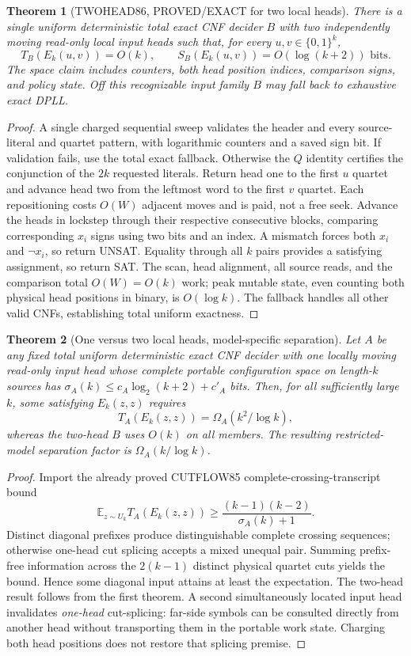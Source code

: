 \documentclass[11pt]{article}
\newtheorem{theorem}{Theorem}
\begin{document}
\begin{theorem}[TWOHEAD86, PROVED/EXACT for two local heads]
There is a single uniform deterministic total exact CNF decider $B$ with two independently moving read-only local input heads such that, for every $u,v\in\{0,1\}^k$,
\[
\boxed{T_B(E_k(u,v))=O(k),\qquad S_B(E_k(u,v))=O(\log(k+2))\text{ bits}.}
\]
The space claim includes counters, both head position indices, comparison signs, and policy state. Off this recognizable input family $B$ may fall back to exhaustive exact DPLL.
\end{theorem}
\begin{proof}
A single charged sequential sweep validates the header and every source-literal and quartet pattern, with logarithmic counters and a saved sign bit. If validation fails, use the total exact fallback. Otherwise the $Q$ identity certifies the conjunction of the $2k$ requested literals. Return head one to the first $u$ quartet and advance head two from the leftmost word to the first $v$ quartet. Each repositioning costs $O(W)$ adjacent moves and is paid, not a free seek. Advance the heads in lockstep through their respective consecutive blocks, comparing corresponding $x_i$ signs using two bits and an index. A mismatch forces both $x_i$ and $\neg x_i$, so return UNSAT. Equality through all $k$ pairs provides a satisfying assignment, so return SAT. The scan, head alignment, all source reads, and the comparison total $O(W)=O(k)$ work; peak mutable state, even counting both physical head positions in binary, is $O(\log k)$. The fallback handles all other valid CNFs, establishing total uniform exactness.
\end{proof}

\begin{theorem}[One versus two local heads, model-specific separation]
Let $A$ be any fixed total uniform deterministic exact CNF decider with one locally moving read-only input head whose \emph{complete portable configuration space} on length-$k$ sources has $\sigma_A(k)\le c_A\log_2(k+2)+c'_A$ bits. Then, for all sufficiently large $k$, some satisfying $E_k(z,z)$ requires
\[
\boxed{T_A(E_k(z,z))=\Omega_A(k^2/\log k),}
\]
whereas the two-head $B$ uses $O(k)$ on \emph{all} members. The resulting restricted-model separation factor is $\Omega_A(k/\log k)$.
\end{theorem}
\begin{proof}
Import the already proved CUTFLOW85 complete-crossing-transcript bound
\[
\mathbb E_{z\sim U_k}T_A(E_k(z,z))
\ge \frac{(k-1)(k-2)}{\sigma_A(k)+1}.
\]
Distinct diagonal prefixes produce distinguishable complete crossing sequences; otherwise one-head cut splicing accepts a mixed unequal pair. Summing prefix-free information across the $2(k-1)$ distinct physical quartet cuts yields the bound. Hence some diagonal input attains at least the expectation. The two-head result follows from the first theorem. A second simultaneously located input head invalidates \emph{one-head} cut-splicing: far-side symbols can be consulted directly from another head without transporting them in the portable work state. Charging both head positions does not restore that splicing premise.
\end{proof}
\end{document}
